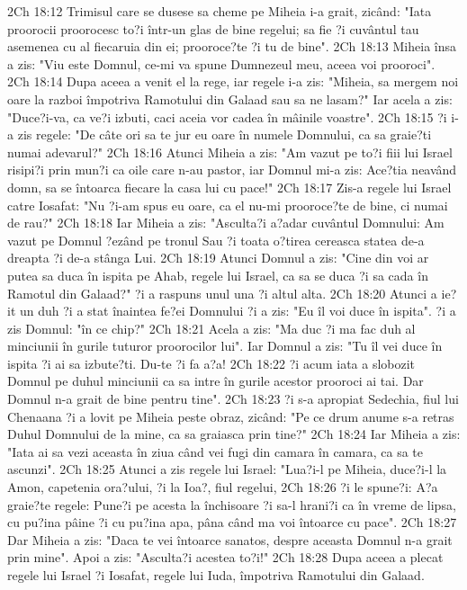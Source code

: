 2Ch 18:12  Trimisul care se dusese sa cheme pe Miheia i-a grait, zicând: "Iata proorocii proorocesc to?i într-un glas de bine regelui; sa fie ?i cuvântul tau asemenea cu al fiecaruia din ei; prooroce?te ?i tu de bine".
2Ch 18:13  Miheia însa a zis: "Viu este Domnul, ce-mi va spune Dumnezeul meu, aceea voi prooroci".
2Ch 18:14  Dupa aceea a venit el la rege, iar regele i-a zis: "Miheia, sa mergem noi oare la razboi împotriva Ramotului din Galaad sau sa ne lasam?" Iar acela a zis: "Duce?i-va, ca ve?i izbuti, caci aceia vor cadea în mâinile voastre".
2Ch 18:15  ?i i-a zis regele: "De câte ori sa te jur eu oare în numele Domnului, ca sa graie?ti numai adevarul?"
2Ch 18:16  Atunci Miheia a zis: "Am vazut pe to?i fiii lui Israel risipi?i prin mun?i ca oile care n-au pastor, iar Domnul mi-a zis: Ace?tia neavând domn, sa se întoarca fiecare la casa lui cu pace!"
2Ch 18:17  Zis-a regele lui Israel catre Iosafat: "Nu ?i-am spus eu oare, ca el nu-mi prooroce?te de bine, ci numai de rau?"
2Ch 18:18  Iar Miheia a zis: "Asculta?i a?adar cuvântul Domnului: Am vazut pe Domnul ?ezând pe tronul Sau ?i toata o?tirea cereasca statea de-a dreapta ?i de-a stânga Lui.
2Ch 18:19  Atunci Domnul a zis: "Cine din voi ar putea sa duca în ispita pe Ahab, regele lui Israel, ca sa se duca ?i sa cada în Ramotul din Galaad?" ?i a raspuns unul una ?i altul alta.
2Ch 18:20  Atunci a ie?it un duh ?i a stat înaintea fe?ei Domnului ?i a zis: "Eu îl voi duce în ispita". ?i a zis Domnul: "în ce chip?"
2Ch 18:21  Acela a zis: "Ma duc ?i ma fac duh al minciunii în gurile tuturor proorocilor lui". Iar Domnul a zis: "Tu îl vei duce în ispita ?i ai sa izbute?ti. Du-te ?i fa a?a!
2Ch 18:22  ?i acum iata a slobozit Domnul pe duhul minciunii ca sa intre în gurile acestor prooroci ai tai. Dar Domnul n-a grait de bine pentru tine".
2Ch 18:23  ?i s-a apropiat Sedechia, fiul lui Chenaana ?i a lovit pe Miheia peste obraz, zicând: "Pe ce drum anume s-a retras Duhul Domnului de la mine, ca sa graiasca prin tine?"
2Ch 18:24  Iar Miheia a zis: "Iata ai sa vezi aceasta în ziua când vei fugi din camara în camara, ca sa te ascunzi".
2Ch 18:25  Atunci a zis regele lui Israel: "Lua?i-l pe Miheia, duce?i-l la Amon, capetenia ora?ului, ?i la Ioa?, fiul regelui,
2Ch 18:26  ?i le spune?i: A?a graie?te regele: Pune?i pe acesta la închisoare ?i sa-l hrani?i ca în vreme de lipsa, cu pu?ina pâine ?i cu pu?ina apa, pâna când ma voi întoarce cu pace".
2Ch 18:27  Dar Miheia a zis: "Daca te vei întoarce sanatos, despre aceasta Domnul n-a grait prin mine". Apoi a zis: "Asculta?i acestea to?i!"
2Ch 18:28  Dupa aceea a plecat regele lui Israel ?i Iosafat, regele lui Iuda, împotriva Ramotului din Galaad.
